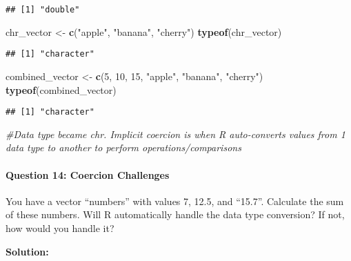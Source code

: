 \documentclass[
]{article}
\newenvironment{Shaded}{\begin{snugshade}}{\end{snugshade}}
\newcommand{\CommentTok}[1]{\textcolor[rgb]{0.56,0.35,0.01}{\textit{#1}}}
\newcommand{\DecValTok}[1]{\textcolor[rgb]{0.00,0.00,0.81}{#1}}
\newcommand{\FunctionTok}[1]{\textcolor[rgb]{0.13,0.29,0.53}{\textbf{#1}}}
\newcommand{\NormalTok}[1]{#1}
\newcommand{\OtherTok}[1]{\textcolor[rgb]{0.56,0.35,0.01}{#1}}
\newcommand{\StringTok}[1]{\textcolor[rgb]{0.31,0.60,0.02}{#1}}
\begin{document}
\begin{verbatim}
## [1] "double"
\end{verbatim}

\begin{Shaded}
\begin{Highlighting}[]
\NormalTok{chr\_vector }\OtherTok{\textless{}{-}} \FunctionTok{c}\NormalTok{(}\StringTok{"apple"}\NormalTok{, }\StringTok{"banana"}\NormalTok{, }\StringTok{"cherry"}\NormalTok{)}
\FunctionTok{typeof}\NormalTok{(chr\_vector)}
\end{Highlighting}
\end{Shaded}

\begin{verbatim}
## [1] "character"
\end{verbatim}

\begin{Shaded}
\begin{Highlighting}[]
\NormalTok{combined\_vector }\OtherTok{\textless{}{-}} \FunctionTok{c}\NormalTok{(}\DecValTok{5}\NormalTok{, }\DecValTok{10}\NormalTok{, }\DecValTok{15}\NormalTok{, }\StringTok{"apple"}\NormalTok{, }\StringTok{"banana"}\NormalTok{, }\StringTok{"cherry"}\NormalTok{)}
\FunctionTok{typeof}\NormalTok{(combined\_vector)}
\end{Highlighting}
\end{Shaded}

\begin{verbatim}
## [1] "character"
\end{verbatim}

\begin{Shaded}
\begin{Highlighting}[]
\CommentTok{\#Data type became chr. Implicit coercion is when R auto{-}converts values from 1 data type to another to perform operations/comparisons}
\end{Highlighting}
\end{Shaded}

\hypertarget{question-14-coercion-challenges}{%
\paragraph{Question 14: Coercion
Challenges}\label{question-14-coercion-challenges}}

You have a vector ``numbers'' with values 7, 12.5, and ``15.7''.
Calculate the sum of these numbers. Will R automatically handle the data
type conversion? If not, how would you handle it?

\textbf{Solution:}
\end{document}
